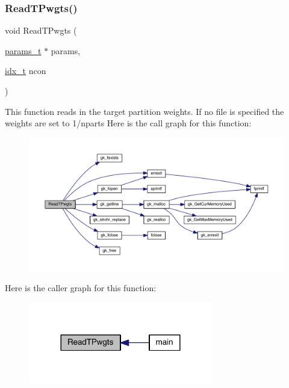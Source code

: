 \subsubsection{\texorpdfstring{Read\+T\+Pwgts()}{ReadTPwgts()}}
{\footnotesize\ttfamily void Read\+T\+Pwgts (\begin{DoxyParamCaption}\item[{\hyperlink{a00706}{params\+\_\+t} $\ast$}]{params,  }\item[{\hyperlink{a00876_aaa5262be3e700770163401acb0150f52}{idx\+\_\+t}}]{ncon }\end{DoxyParamCaption})}

This function reads in the target partition weights. If no file is specified the weights are set to 1/nparts Here is the call graph for this function\+:\nopagebreak
\begin{figure}[H]
\begin{center}
\leavevmode
\includegraphics[width=350pt]{a00858_a12b940ccee061b8787088fbe16245f46_cgraph}
\end{center}
\end{figure}
Here is the caller graph for this function\+:\nopagebreak
\begin{figure}[H]
\begin{center}
\leavevmode
\includegraphics[width=228pt]{a00858_a12b940ccee061b8787088fbe16245f46_icgraph}
\end{center}
\end{figure}
\mbox{\label{a00858_a91b3b24f2b508da8f2e2df7bc2c94cc6}} 
